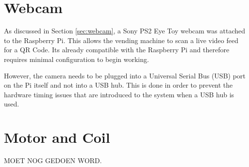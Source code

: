 \section{Webcam}

As discussed in Section \ref{sec:webcam}, a Sony PS2 Eye Toy  webcam was
attached to the Raspberry Pi. This allows the vending machine to scan a live
video feed for a QR Code. Its already compatible with the Raspberry Pi and
therefore requires minimal configuration to begin working.

However, the camera needs to be plugged into a Universal Serial Bus (USB) port
on the Pi itself and not into a USB hub. This is done in order to prevent the
hardware timing issues that are introduced to the system when a USB hub is used. 

\section{Motor and Coil}

MOET NOG GEDOEN WORD.




